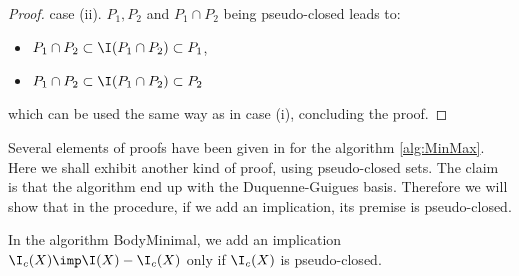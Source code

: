 \begin{proof}
case (ii). $P_1, P_2$ and $P_1 \cap P_2$ being pseudo-closed leads to:
\begin{itemize}
	\item $P_1 \cap P_2 \subset \I(P_1 \cap P_2) \subset P_1$,
	\item $P_1 \cap P_2 \subset \I(P_1 \cap P_2) \subset P_2$
\end{itemize}
\noindent which can be used the same way as in case (i), concluding the proof.

\end{proof}

Several elements of proofs have been given in \cite{berczi_directed_2017} for
the algorithm \ref{alg:MinMax}. Here we shall exhibit another kind of proof, 
using pseudo-closed sets. The claim is that the algorithm end up with the 
Duquenne-Guigues basis. Therefore we will show that in the procedure, if we
add an implication, its premise is pseudo-closed.

\begin{proposition} \label{prop:let.algo_min}
In the algorithm BodyMinimal, we add an implication 
$\I_c(X) \imp \I(X) - \I_c(X)$ only if $\I_c(X)$ is pseudo-closed.
	
\end{proposition}

